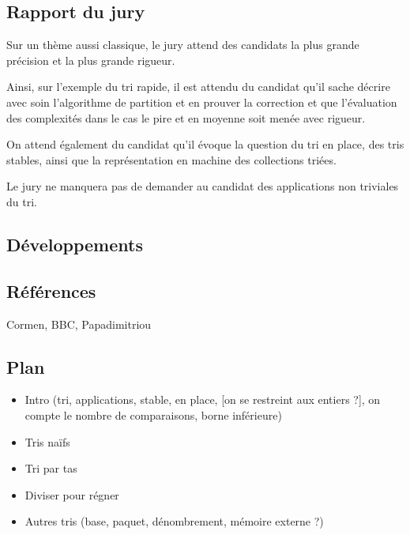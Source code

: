 \documentclass[../../agregation.tex]{subfiles}
\begin{document}

\subsection{Rapport du jury}

\begin{aquote}{}
Sur un thème aussi classique, le jury attend des candidats la plus grande précision et la plus grande rigueur.

Ainsi, sur l'exemple du tri rapide, il est attendu du candidat qu'il sache décrire avec soin l'algorithme de partition et en prouver la correction et que l'évaluation des complexités dans le cas le pire et en moyenne soit menée avec rigueur.

On attend également du candidat qu'il évoque la question du tri en place, des tris stables, ainsi que la représentation en machine des collections triées.

Le jury ne manquera pas de demander au candidat des applications non triviales du tri.
\end{aquote}

\subsection{Développements}

\dvts

\subsection{Références}

Cormen, BBC, Papadimitriou

\subsection{Plan}

\begin{itemize}
	\item Intro (tri, applications, stable, en place, [on se restreint aux entiers ?], on compte le nombre de comparaisons, borne inférieure)
	\item Tris naïfs
	\item Tri par tas
	\item Diviser pour régner
	\item Autres tris (base, paquet, dénombrement, mémoire externe ?)
\end{itemize}
\end{document}

